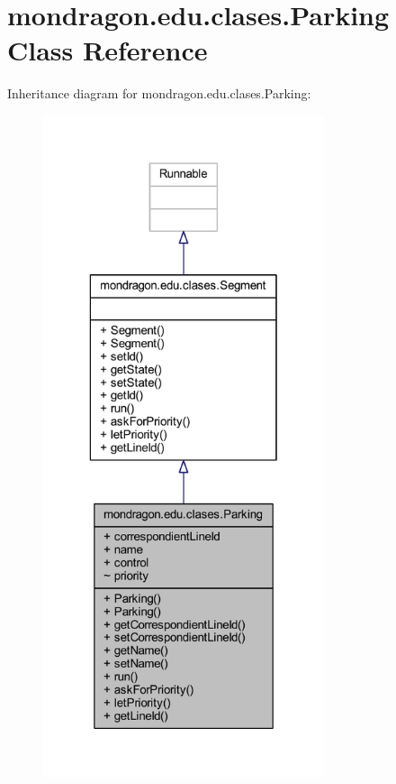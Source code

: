 \hypertarget{classmondragon_1_1edu_1_1clases_1_1_parking}{}\section{mondragon.\+edu.\+clases.\+Parking Class Reference}
\label{classmondragon_1_1edu_1_1clases_1_1_parking}


Inheritance diagram for mondragon.\+edu.\+clases.\+Parking\+:\nopagebreak
\begin{figure}[H]
\begin{center}
\leavevmode
\includegraphics[height=550pt]{classmondragon_1_1edu_1_1clases_1_1_parking__inherit__graph}
\end{center}
\end{figure}


